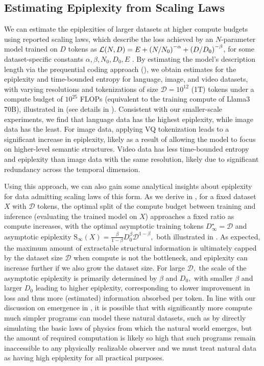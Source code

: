 \documentclass[twoside]{article}
\renewcommand{\L}{\mathcal{L}}
\newcommand{\D}{\mathcal{D}}
\newcommand{\rS}{\mathrm{S}}
\renewcommand{\L}{\mathcal{L}}
\begin{document}
\subsection{Estimating Epiplexity from Scaling Laws}
We can estimate the epiplexities of larger datasets at higher compute budgets using reported scaling laws, 
which describe the loss achieved by an $N$-parameter model trained on $D$ tokens as $\L(N,D) = E + \qty(N/N_0)^{-\alpha} + \qty(D/D_0)^{-\beta}$, for some dataset-specific constants $\alpha,\beta,N_0, D_0, E$ \citep{hoffmann2022training,kaplan2020scaling,henighan2020scaling}. By estimating the model's description length via the prequential coding approach (), we obtain estimates for the epiplexity and time-bounded entropy for language, image, and video datasets, with varying resolutions and tokenizations of size $\D=10^{12}$ (1T) tokens under a compute budget of $10^{25}$ FLOPs (equivalent to the training compute of Llama3 70B), illustrated in  (see details in ). Consistent with our smaller-scale experiments, we find that language data has the highest epiplexity, while image data has the least. For image data, applying VQ tokenization leads to a significant increase in epiplexity, likely as a result of allowing the model to focus on higher-level semantic structures. Video data has less time-bounded entropy and epiplexity than image data with the same resolution, likely due to significant redundancy across the temporal dimension.

Using this approach, we can also gain some analytical insights about epiplexity for data admitting scaling laws of this form. As we derive in , for a fixed dataset $X$ with $\D$ tokens, the optimal split of the compute budget between training and inference (evaluating the trained model on $X$) approaches a fixed ratio as compute increases, with the optimal asymptotic training tokens $D^\star_\infty = \D$ and asymptotic epiplexity $\rS_\infty(X) = \frac{\beta}{1-\beta} D_0^\beta \D^{1-\beta},$ both illustrated in . As expected, the maximum amount of extractable structural information is ultimately capped by the dataset size $\D$ when compute is not the bottleneck, and epiplexity can increase further if we also grow the dataset size. For large $\D,$ the scale of the asymptotic epiplexity is primarily determined by $\beta$ and $D_0,$ with smaller $\beta$ and larger $D_0$ leading to higher epiplexity, corresponding to slower improvement in loss and thus more (estimated) information absorbed per token. In line with our discussion on emergence in , it is possible that with significantly more compute much simpler programs can model these natural datasets, such as by directly simulating the basic laws of physics from which the natural world emerges, but the amount of required computation is likely so high that such programs remain inaccessible to any physically realizable observer and we must treat natural data as having high epiplexity for all practical purposes.
\end{document}
